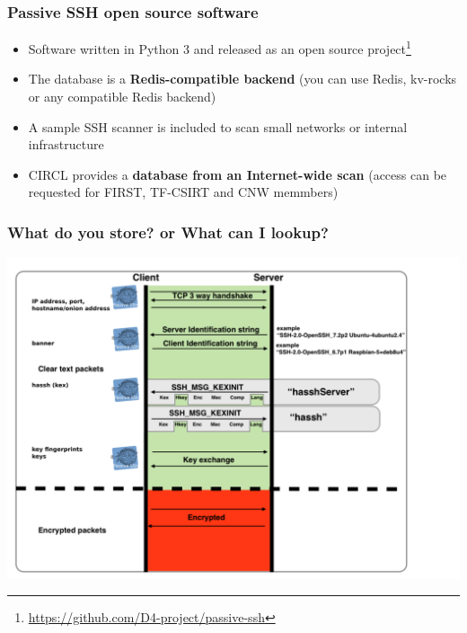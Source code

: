 \documentclass{beamer}
\begin{document}
\begin{frame}
        \frametitle{Passive SSH open source software}
        \begin{itemize}
                \item Software written in Python 3 and released as an open source project\footnote{\url{https://github.com/D4-project/passive-ssh}}
                \item The database is a {\bf Redis-compatible backend} (you can use Redis, kv-rocks or any compatible Redis backend)
                \item A sample SSH scanner is included to scan small networks or internal infrastructure
                \item CIRCL provides a {\bf database from an Internet-wide scan} (access can be requested for FIRST, TF-CSIRT and CNW memmbers)
        \end{itemize}
\end{frame}

\begin{frame}
        \frametitle{What do you store? or What can I lookup?}
        \includegraphics[scale=0.3]{sshhandshake.png}
\end{frame}
\end{document}
